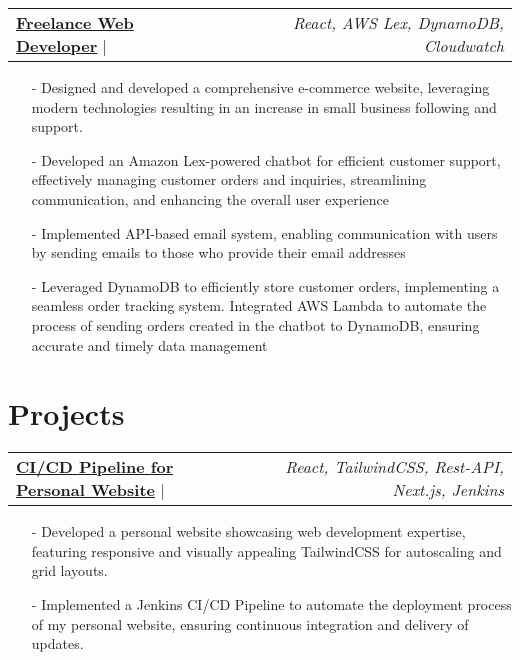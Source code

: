 \documentclass[a4paper,12pt]{article}
\begin{document}
\begin{tabularx}{\linewidth}{ @{}X r@{} }
    \href{https://the-soaring-artist-website.vercel.app/}{\textbf{Freelance Web Developer}} $\vert$ & \textit{React, AWS Lex, DynamoDB, Cloudwatch   } \\
\end{tabularx}
\begin{minipage}{\linewidth}
    \begin{itemize}[nosep,after=\strut, leftmargin=1em]
        \item[-] Designed and developed a comprehensive e-commerce website, leveraging modern technologies resulting in an increase in small business following and support. 

        \item[-] 
Developed an Amazon Lex-powered chatbot for efficient customer support, effectively managing customer orders and inquiries, streamlining communication, and enhancing the overall user experience

        \item[-] 
Implemented API-based email system, enabling communication with users by sending emails to those who provide their email addresses

        \item[-] 
Leveraged DynamoDB to efficiently store customer orders, implementing a seamless order tracking system. Integrated AWS Lambda to automate the process of sending orders created in the chatbot to DynamoDB, ensuring accurate and timely data management

    \end{itemize}
\end{minipage}




\section{Projects}

\begin{tabularx}{\linewidth}{ @{}X r@{} }
    \href{https://ishan-next-react-website.vercel.app/}{\textbf{CI/CD Pipeline for Personal Website}} $\vert$ & \textit{React, TailwindCSS, Rest-API, Next.js, Jenkins} \\
\end{tabularx}
\begin{minipage}{\linewidth}
    \begin{itemize}[nosep,after=\strut, leftmargin=1em]
    \item[-] Developed a personal website showcasing web development expertise, featuring responsive and visually appealing TailwindCSS for autoscaling and grid layouts.

    \item[-] Implemented a Jenkins CI/CD Pipeline to automate the deployment process of my personal website, ensuring continuous integration and delivery of updates.
    \end{itemize}
\end{minipage}
\end{document}
